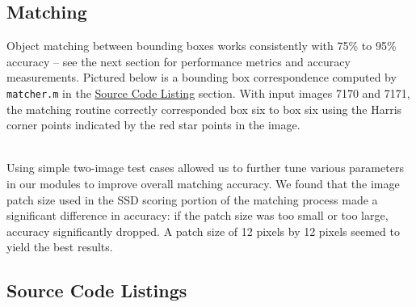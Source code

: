 \documentclass{article}
\begin{document}
\subsection{Matching}
Object matching between bounding boxes works consistently with 75\% to 95\% accuracy -- see the next section for performance metrics and accuracy measurements.  Pictured below is a bounding box correspondence computed by \texttt{matcher.m} in the \hyperref[source]{Source Code Listing} section.  With input images 7170 and 7171, the matching routine correctly corresponded box six to box six using the Harris corner points indicated by the red star points in the image.
\begin{center}
\end{center}
~\\
Using simple two-image test cases allowed us to further tune various parameters in our modules to improve overall matching accuracy.  We found that the image patch size used in the SSD scoring portion of the matching process made a significant difference in accuracy: if the patch size was too small or too large, accuracy significantly dropped.  A patch size of 12 pixels by 12 pixels seemed to yield the best results.

\newpage
\begin{appendices}
\section{Source Code Listings}\label{source}
% 







\end{appendices}
\end{document}
